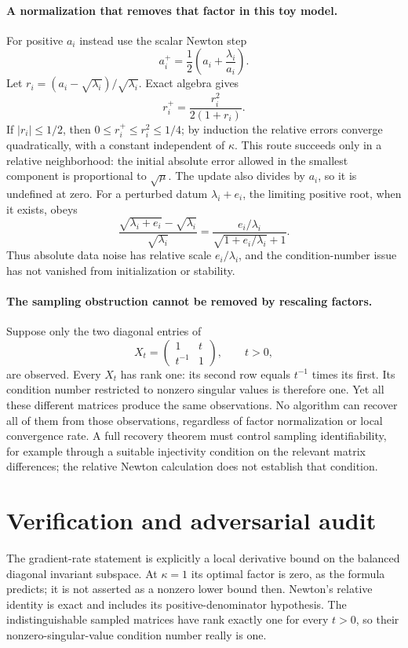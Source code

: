 \documentclass[11pt]{article}
\begin{document}
\paragraph{A normalization that removes that factor in this toy model.}
For positive $a_i$ instead use the scalar Newton step
\[
 a_i^+=\frac12\left(a_i+\frac{\lambda_i}{a_i}\right).
\]
Let $r_i=(a_i-\sqrt{\lambda_i})/\sqrt{\lambda_i}$. Exact algebra gives
\[
 r_i^+=\frac{r_i^2}{2(1+r_i)}.
\]
If $|r_i|\leq1/2$, then $0\leq r_i^+\leq r_i^2\leq1/4$; by induction the
relative errors converge quadratically, with a constant independent of
$\kappa$. This route succeeds only in a relative neighborhood: the initial
absolute error allowed in the smallest component is proportional to
$\sqrt\mu$. The update also divides by $a_i$, so it is undefined at zero.
For a perturbed datum $\lambda_i+e_i$, the limiting positive root, when it
exists, obeys
\[
 \frac{\sqrt{\lambda_i+e_i}-\sqrt{\lambda_i}}{\sqrt{\lambda_i}}
 =\frac{e_i/\lambda_i}{\sqrt{1+e_i/\lambda_i}+1}.
\]
Thus absolute data noise has relative scale $e_i/\lambda_i$, and the
condition-number issue has not vanished from initialization or stability.

\paragraph{The sampling obstruction cannot be removed by rescaling factors.}
Suppose only the two diagonal entries of
\[
 X_t=\begin{pmatrix}1&t\\t^{-1}&1\end{pmatrix},\qquad t>0,
\]
are observed. Every $X_t$ has rank one: its second row equals $t^{-1}$ times
its first. Its condition number restricted to nonzero singular values is
therefore one. Yet all these different matrices produce the same observations.
No algorithm can recover all of them from those observations, regardless of
factor normalization or local convergence rate. A full recovery theorem must
control sampling identifiability, for example through a suitable injectivity
condition on the relevant matrix differences; the relative Newton calculation
does not establish that condition.

\section{Verification and adversarial audit}

The gradient-rate statement is explicitly a local derivative bound on the
balanced diagonal invariant subspace. At $\kappa=1$ its optimal factor is zero,
as the formula predicts; it is not asserted as a nonzero lower bound then.
Newton's relative identity is exact and includes its positive-denominator
hypothesis. The indistinguishable sampled matrices have rank exactly one for
every $t>0$, so their nonzero-singular-value condition number really is one.
\end{document}
